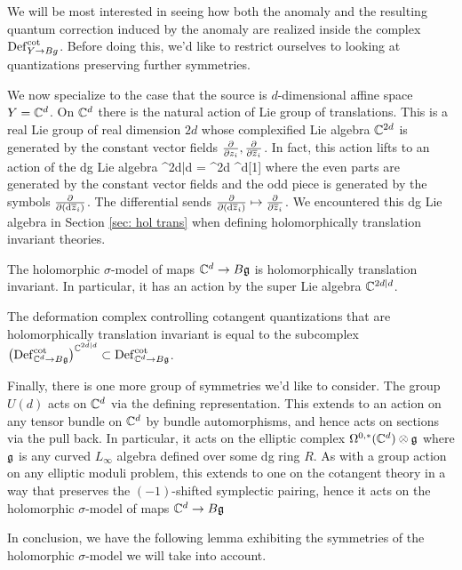 We will be most interested in seeing how both the anomaly and the resulting quantum correction induced by the anomaly are realized inside the complex ${\rm Def}_{Y \to Bg}^{\rm cot}$. 
Before doing this, we'd like to restrict ourselves to looking at quantizations preserving further symmetries. 

We now specialize to the case that the source is $d$-dimensional affine space $Y = \mathbb C^d$.
On $\mathbb C^d$ there is the natural action of Lie group of translations. 
This is a real Lie group of real dimension $2d$ whose complexified Lie algebra $\mathbb C^{2d}$ is generated by the constant vector fields $\frac{\partial}{\partial z_i}, \frac{\partial}{\partial \overline{z}_i}$.
In fact, this action lifts to an action of the dg Lie algebra
\ben
\CC^{2d|d} = \CC^{2d} \oplus \CC^d[1]
\een
where the even parts are generated by the constant vector fields and the odd piece is generated by the symbols $\frac{\partial}{\partial ({\rm d} \overline{z}_i)}$. 
The differential sends $\frac{\partial}{\partial ({\rm d} \overline{z}_i)} \mapsto \frac{\partial}{\partial \overline{z}_i}$.
We encountered this dg Lie algebra in Section \ref{sec: hol trans} when defining holomorphically translation invariant theories.

\begin{lem}
The holomorphic $\sigma$-model of maps $\mathbb C^d \to B \mathfrak g$ is holomorphically translation invariant. 
In particular, it has an action by the super Lie algebra $\mathbb C^{2d|d}$. 
\end{lem}

The deformation complex controlling cotangent quantizations that are holomorphically translation invariant is equal to the subcomplex $\left({\rm Def}_{\mathbb C^d \to B \mathfrak g}^{\rm cot}\right)^{\mathbb C^{2d|d}} \subset {\rm Def}^{\rm cot}_{\mathbb C^d \to B \mathfrak g}$. 

Finally, there is one more group of symmetries we'd like to consider.
The group $U(d)$ acts on $\mathbb C^d$ via the defining representation.
This extends to an action on any tensor bundle on $\mathbb C^d$ by bundle automorphisms, and hence acts on sections via the pull back. 
In particular, it acts on the elliptic complex $\Omega^{0,*}(\mathbb C^d) \otimes \mathfrak g$ where $\mathfrak g$ is any curved $L_\infty$ algebra defined over some dg ring $R$. 
As with a group action on any elliptic moduli problem, this extends to one on the cotangent theory in a way that preserves the $(-1)$-shifted symplectic pairing, hence it acts on the holomorphic $\sigma$-model of maps $\mathbb C^d \to B \mathfrak g$

In conclusion, we have the following lemma exhibiting the symmetries of the holomorphic $\sigma$-model we will take into account.

